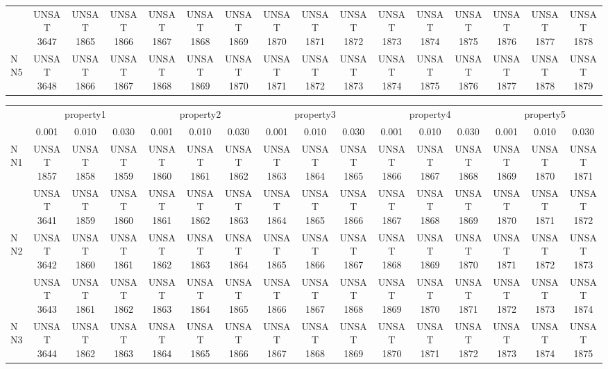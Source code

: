 \documentclass[runningheads]{llncs}
\begin{document}
\begin{table}[h]
\begin{tabular}{lccccccccccccccc}
    & 	 UNSAT 3647 	 & 	 UNSAT 1865 	 & 	 UNSAT 1866 	 & 	 UNSAT 1867 	 & 	 UNSAT 1868 	 & 	 UNSAT 1869 	 & 	 UNSAT 1870 	 & 	 UNSAT 1871 	 & 	 UNSAT 1872 	 & 	 UNSAT 1873 	 & 	 UNSAT 1874 	 & 	 UNSAT 1875 	 & 	 UNSAT 1876 	 & 	 UNSAT 1877 	 & 	 UNSAT 1878 \\ 
NN5 	 & 	 UNSAT 3648 	 & 	 UNSAT 1866 	 & 	 UNSAT 1867 	 & 	 UNSAT 1868 	 & 	 UNSAT 1869 	 & 	 UNSAT 1870 	 & 	 UNSAT 1871 	 & 	 UNSAT 1872 	 & 	 UNSAT 1873 	 & 	 UNSAT 1874 	 & 	 UNSAT 1875 	 & 	 UNSAT 1876 	 & 	 UNSAT 1877 	 & 	 UNSAT 1878 	 & 	 UNSAT 1879 \\ 
\end{tabular}

\begin{tabular}{lccccccccccccccc} 
    & 	 \multicolumn{3}{c}{property1} 	 & 	 \multicolumn{3}{c}{property2} 	 & 	 \multicolumn{3}{c}{property3} 	 & 	 \multicolumn{3}{c}{property4} 	 & 	 \multicolumn{3}{c}{property5} \\ 
    & 	 0.001 	 & 	 0.010 	 & 	 0.030 	 & 	 0.001 	 & 	 0.010 	 & 	 0.030 	 & 	 0.001 	 & 	 0.010 	 & 	 0.030 	 & 	 0.001 	 & 	 0.010 	 & 	 0.030 	 & 	 0.001 	 & 	 0.010 	 & 	 0.030 \\ 
NN1 	 & 	 UNSAT 1857 	 & 	 UNSAT 1858 	 & 	 UNSAT 1859 	 & 	 UNSAT 1860 	 & 	 UNSAT 1861 	 & 	 UNSAT 1862 	 & 	 UNSAT 1863 	 & 	 UNSAT 1864 	 & 	 UNSAT 1865 	 & 	 UNSAT 1866 	 & 	 UNSAT 1867 	 & 	 UNSAT 1868 	 & 	 UNSAT 1869 	 & 	 UNSAT 1870 	 & 	 UNSAT 1871 \\ 
    & 	 UNSAT 3641 	 & 	 UNSAT 1859 	 & 	 UNSAT 1860 	 & 	 UNSAT 1861 	 & 	 UNSAT 1862 	 & 	 UNSAT 1863 	 & 	 UNSAT 1864 	 & 	 UNSAT 1865 	 & 	 UNSAT 1866 	 & 	 UNSAT 1867 	 & 	 UNSAT 1868 	 & 	 UNSAT 1869 	 & 	 UNSAT 1870 	 & 	 UNSAT 1871 	 & 	 UNSAT 1872 \\ 
NN2 	 & 	 UNSAT 3642 	 & 	 UNSAT 1860 	 & 	 UNSAT 1861 	 & 	 UNSAT 1862 	 & 	 UNSAT 1863 	 & 	 UNSAT 1864 	 & 	 UNSAT 1865 	 & 	 UNSAT 1866 	 & 	 UNSAT 1867 	 & 	 UNSAT 1868 	 & 	 UNSAT 1869 	 & 	 UNSAT 1870 	 & 	 UNSAT 1871 	 & 	 UNSAT 1872 	 & 	 UNSAT 1873 \\ 
    & 	 UNSAT 3643 	 & 	 UNSAT 1861 	 & 	 UNSAT 1862 	 & 	 UNSAT 1863 	 & 	 UNSAT 1864 	 & 	 UNSAT 1865 	 & 	 UNSAT 1866 	 & 	 UNSAT 1867 	 & 	 UNSAT 1868 	 & 	 UNSAT 1869 	 & 	 UNSAT 1870 	 & 	 UNSAT 1871 	 & 	 UNSAT 1872 	 & 	 UNSAT 1873 	 & 	 UNSAT 1874 \\ 
NN3 	 & 	 UNSAT 3644 	 & 	 UNSAT 1862 	 & 	 UNSAT 1863 	 & 	 UNSAT 1864 	 & 	 UNSAT 1865 	 & 	 UNSAT 1866 	 & 	 UNSAT 1867 	 & 	 UNSAT 1868 	 & 	 UNSAT 1869 	 & 	 UNSAT 1870 	 & 	 UNSAT 1871 	 & 	 UNSAT 1872 	 & 	 UNSAT 1873 	 & 	 UNSAT 1874 	 & 	 UNSAT 1875 \\ 

\end{tabular}
\end{table}
\end{document}
